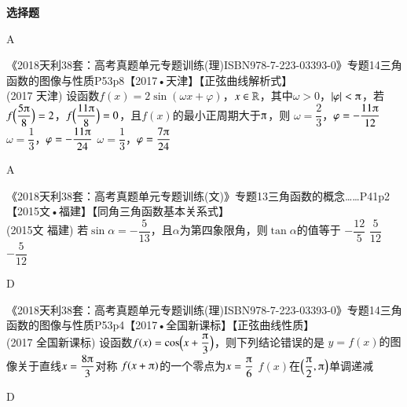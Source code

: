 \begin{exercise}{\bf 选择题}
\begin{minipage}[h]{0.2\linewidth}
\begin{center}
        \end{center}
      \end{minipage}
       \begin{answer}
         A
       \end{answer}
      \vspace{-0.9cm}
    \item 《2018天利38套：高考真题单元专题训练(理)ISBN978-7-223-03393-0》专题14三角函数的图像与性质P53p8【2017•天津】【正弦曲线解析式】\\
          {\kaishu (2017 \textbullet 天津)}
          设函数$f(x)=2\sin(\omega x+\varphi)$，$x\in\mathbb{R}$，其中$\omega>0$，$\abs{\varphi}<\piup$，若$f\Bp{\dfrac{5\piup}8}=2$，$f\Bp{\dfrac{11\piup}8}=0$，且$f(x)$的最小正周期大于$\piup$，则\xz
           {$\omega=\dfrac23$，$\varphi=-\dfrac{11\piup}{12}$}
           {$\omega=\dfrac13$，$\varphi=-\dfrac{11\piup}{24}$}
           {$\omega=\dfrac13$，$\varphi=\dfrac{7\piup}{24}$}
          \begin{answer}
            A
          \end{answer}
    \item 《2018天利38套：高考真题单元专题训练(文)》专题13三角函数的概念……P41p2【2015文•福建】【同角三角函数基本关系式】\\
      {\kaishu (2015文 \textbullet 福建)}
      若$\sin\alpha=-\dfrac5{13}$，且$\alpha$为第四象限角，则$\tan\alpha$的值等于\xz
       {$-\dfrac{12}5$}
       {$\dfrac5{12}$}
       {$-\dfrac5{12}$}
      \begin{answer}
        D
      \end{answer}
    \item 《2018天利38套：高考真题单元专题训练(理)ISBN978-7-223-03393-0》专题14三角函数的图像与性质P53p4【2017•全国新课标】【正弦曲线性质】\\
        {\kaishu (2017 \textbullet 全国新课标)}
        设函数$f(x)=\cos\Bp{x+\dfrac{\piup}3}$，则下列结论错误的是\xz
         {$y=f(x)$的图像关于直线$x=\dfrac{8\piup}3$对称}
         {$f(x+\piup)$的一个零点为$x=\dfrac{\piup}6$}
         {$f(x)$在$\Bp{\dfrac{\piup}2,\piup}$单调递减}
        \begin{answer}
          D
        \end{answer}

\end{exercise}
